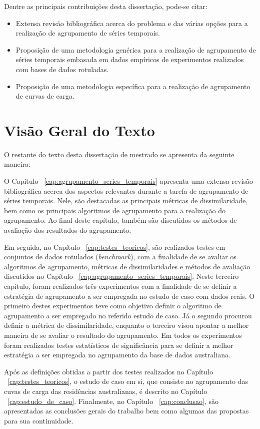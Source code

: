 Dentre as principais contribuições desta dissertação, pode-se citar:
\begin{itemize}
	\item Extensa revisão bibliográfica acerca do problema e das várias opções para a realização de agrupamento de séries temporais.
	\item Proposição de uma metodologia genérica para a realização de agrupamento de séries temporais embasada em dados empíricos de experimentos realizados com bases de dados rotuladas.
	\item Proposição de uma metodologia específica para a realização de agrupamento de curvas de carga.
\end{itemize}

\section{Visão Geral do Texto}

O restante do texto desta dissertação de mestrado se apresenta da seguinte maneira:

O Capítulo ~\ref{cap:agrupamento_series_temporais} apresenta uma extensa revisão bibliográfica acerca dos aspectos relevantes durante a tarefa de agrupamento de séries temporais. Nele, são destacadas as principais métricas de dissimilaridade, bem como os principais algoritmos de agrupamento para a realização do agrupamento. Ao final deste capítulo, também são discutidos os métodos de avaliação dos resultados do agrupamento.

Em seguida, no Capítulo ~\ref{cap:testes_teoricos}, são realizados testes em conjuntos de dados rotulados (\emph{benchmark}), com a finalidade de se avaliar os algoritmos de agrupamento, métricas de dissimilaridades e métodos de avaliação discutidos no Capítulo ~\ref{cap:agrupamento_series_temporais}. Neste terceiro capítulo, foram realizados três experimentos com a finalidade de se definir a estratégia de agrupamento a ser empregada no estudo de caso com dados reais. O primeiro destes experimentos teve como objetivo definir o algoritmo de agrupamento a ser empregado no referido estudo de caso. Já o segundo procurou definir a métrica de dissimilaridade, enquanto o terceiro visou apontar a melhor maneira de se avaliar o resultado do agrupamento. Em todos os experimentos foram realizados testes estatísticos de significância para se definir a melhor estratégia a ser empregada no agrupamento da base de dados australiana.

Após as definições obtidas a partir dos testes realizados no Capítulo ~\ref{cap:testes_teoricos}, o estudo de caso em si, que consiste no agrupamento das cuvas de carga das residências australianas, é descrito no Capítulo ~\ref{cap:estudo_de_caso}. Finalmente, no Capítulo ~\ref{cap:conclusao}, são apresentadas as conclusões gerais do trabalho bem como algumas das propostas para sua continuidade.
